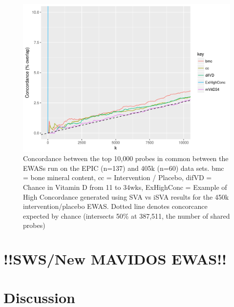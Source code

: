 \documentclass[
]{book}
\begin{document}
\begin{figure}

{\centering \includegraphics[width=0.8\linewidth]{figs/EPIC450kEWASconcordMAVIDOSMonApr162018zoom} 

}

\caption{Concordance between the top 10,000 probes in common between the EWASs run on the EPIC (n=137) and 405k (n=60) data sets. bmc = bone mineral content, cc = Intervention / Placebo, difVD = Chance in Vitamin D from 11 to 34wks, ExHighConc = Example of High Concordance generated using SVA vs iSVA results for the 450k intervention/placebo EWAS. Dotted line denotes concorcance expected by chance (intersects 50\% at 387,511, the number of shared probes)}\label{fig:EPIC450kEWASconcordMAVIDOSMonApr162018zoom}
\end{figure}



\hypertarget{swsnew-mavidos-ewas}{%
\section{!!SWS/New MAVIDOS EWAS!!}\label{swsnew-mavidos-ewas}}

\hypertarget{section}{%
\subsection{}\label{section}}

\hypertarget{discussion-1}{%
\section{Discussion}\label{discussion-1}}
\end{document}
